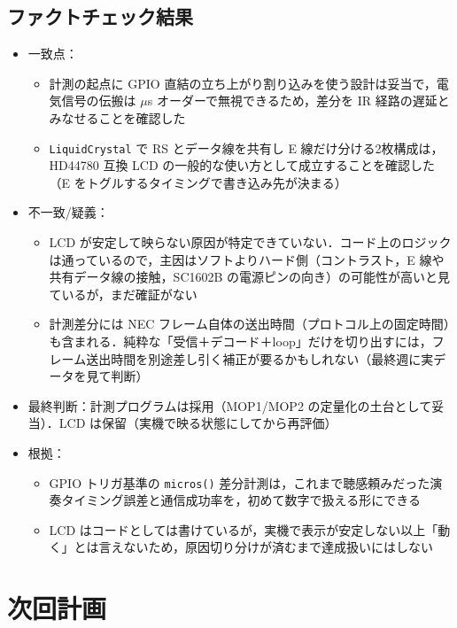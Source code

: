 \documentclass[a4paper,11pt]{ltjsarticle}
\providecommand{\％}{\%}
\begin{document}
\subsection{ファクトチェック結果}\label{sec:ai-fact}

\begin{itemize}
    \item 一致点：
    \begin{itemize}
        \item 計測の起点に GPIO 直結の立ち上がり割り込みを使う設計は妥当で，電気信号の伝搬は $\mu$s オーダーで無視できるため，差分を IR 経路の遅延とみなせることを確認した
        \item \texttt{LiquidCrystal} で RS とデータ線を共有し E 線だけ分ける2枚構成は，HD44780 互換 LCD の一般的な使い方として成立することを確認した（E をトグルするタイミングで書き込み先が決まる）
    \end{itemize}
    \item 不一致/疑義：
    \begin{itemize}
        \item LCD が安定して映らない原因が特定できていない．コード上のロジックは通っているので，主因はソフトよりハード側（コントラスト，E 線や共有データ線の接触，SC1602B の電源ピンの向き）の可能性が高いと見ているが，まだ確証がない
        \item 計測差分には NEC フレーム自体の送出時間（プロトコル上の固定時間）も含まれる．純粋な「受信＋デコード＋loop」だけを切り出すには，フレーム送出時間を別途差し引く補正が要るかもしれない（最終週に実データを見て判断）
    \end{itemize}
    \item 最終判断：計測プログラムは採用（MOP1/MOP2 の定量化の土台として妥当）．LCD は保留（実機で映る状態にしてから再評価）
    \item 根拠：
    \begin{itemize}
        \item GPIO トリガ基準の \texttt{micros()} 差分計測は，これまで聴感頼みだった演奏タイミング誤差と通信成功率を，初めて数字で扱える形にできる
        \item LCD はコードとしては書けているが，実機で表示が安定しない以上「動く」とは言えないため，原因切り分けが済むまで達成扱いにはしない
    \end{itemize}
\end{itemize}

\section{次回計画}\label{sec:next}
\end{document}
